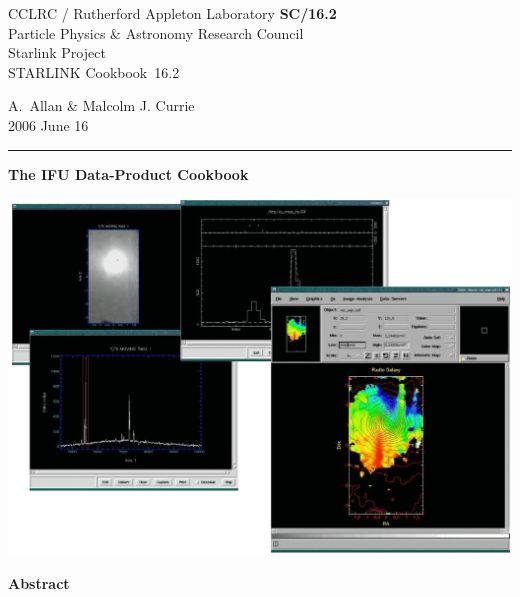 \documentclass[twoside,11pt]{article}
\newcommand{\stardoccategory}  {STARLINK Cookbook}
\newcommand{\stardocinitials}  {SC}
\newcommand{\stardocnumber}    {16.2}
\newcommand{\stardocauthors}   {A.~Allan \& Malcolm J. Currie}
\newcommand{\stardocdate}      {2006 June 16}
\newcommand{\stardoctitle}     {The IFU Data-Product Cookbook}
\newcommand{\stardocname}{\stardocinitials /\stardocnumber}
\newenvironment{latexonly}{}{}
\begin{document}
\thispagestyle{empty}

\begin{latexonly}
   CCLRC / {\sc Rutherford Appleton Laboratory} \hfill {\bf \stardocname}\\
   {\large Particle Physics \& Astronomy Research Council}\\
   {\large Starlink Project\\}
   {\large \stardoccategory\ \stardocnumber}
   \begin{flushright}
   \stardocauthors\\
   \stardocdate
   \end{flushright}
   \vspace{-4mm}
   \rule{\textwidth}{0.5mm}
   \vspace{5mm}
   \begin{center}
   {\Huge\bf  \stardoctitle \\ [2.5ex]}
   \end{center}
   \vspace{5mm}

   \begin{center}
   \includegraphics[scale=0.6]{sc16_cover.eps}
   \end{center}

   \vspace{5mm}
   \begin{center}
      {\Large\bf Abstract}
   \end{center}
\end{latexonly}
\end{document}
